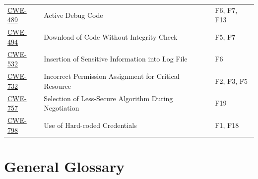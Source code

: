 \documentclass[11pt,a4paper]{article}
\begin{document}
\begin{longtable}{@{}lL{8cm}L{4cm}@{}}
  \href{https://cwe.mitre.org/data/definitions/489.html}{CWE-489}
    & Active Debug Code & F6, F7, F13 \\[0.3em]
  \href{https://cwe.mitre.org/data/definitions/494.html}{CWE-494}
    & Download of Code Without Integrity Check & F5, F7 \\[0.3em]
  \href{https://cwe.mitre.org/data/definitions/532.html}{CWE-532}
    & Insertion of Sensitive Information into Log File & F6 \\[0.3em]
  \href{https://cwe.mitre.org/data/definitions/732.html}{CWE-732}
    & Incorrect Permission Assignment for Critical Resource & F2, F3, F5 \\[0.3em]
  \href{https://cwe.mitre.org/data/definitions/757.html}{CWE-757}
    & Selection of Less-Secure Algorithm During Negotiation & F19 \\[0.3em]
  \href{https://cwe.mitre.org/data/definitions/798.html}{CWE-798}
    & Use of Hard-coded Credentials & F1, F18 \\
\end{longtable}

\section{General Glossary}
\end{document}
